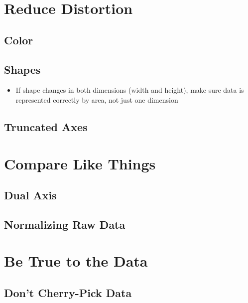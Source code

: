 \documentclass[
]{krantz}
\providecommand{\tightlist}{%
  \setlength{\itemsep}{0pt}\setlength{\parskip}{0pt}}
\begin{document}
\hypertarget{reduce-distortion}{%
\section{Reduce Distortion}\label{reduce-distortion}}

\hypertarget{color}{%
\subsection{Color}\label{color}}

\hypertarget{shapes}{%
\subsection{Shapes}\label{shapes}}

\begin{itemize}
\tightlist
\item
  If shape changes in both dimensions (width and height), make sure data is
  represented correctly by area, not just one dimension
\end{itemize}

\hypertarget{truncated-axes}{%
\subsection{Truncated Axes}\label{truncated-axes}}

\hypertarget{compare-like-things}{%
\section{Compare Like Things}\label{compare-like-things}}

\hypertarget{dual-axis}{%
\subsection{Dual Axis}\label{dual-axis}}

\hypertarget{normalizing-raw-data}{%
\subsection{Normalizing Raw Data}\label{normalizing-raw-data}}

\hypertarget{be-true-to-the-data}{%
\section{Be True to the Data}\label{be-true-to-the-data}}

\hypertarget{dont-cherry-pick-data}{%
\subsection{Don't Cherry-Pick Data}\label{dont-cherry-pick-data}}
\end{document}
